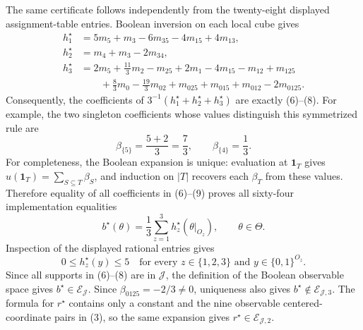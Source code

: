 The same certificate follows independently from the twenty-eight displayed assignment-table entries.  Boolean inversion on each local cube gives
\[
\begin{aligned}
h_1^\star
 &=5m_5+m_3-6m_{35}-4m_{15}+4m_{13},\\
h_2^\star
 &=m_4+m_3-2m_{34},\\
h_3^\star
 &=2m_5+\frac{11}{3}m_2-m_{25}+2m_1-4m_{15}-m_{12}+m_{125}\\
 &\qquad+\frac83m_0-\frac{19}{3}m_{02}+m_{025}+m_{015}+m_{012}-2m_{0125}.
\end{aligned}
\tag{9}
\]
Consequently, the coefficients of \(3^{-1}(h_1^\star+h_2^\star+h_3^\star)\) are exactly (6)--(8).  For example, the two singleton coefficients whose values distinguish this symmetrized rule are
\[
\beta_{\{5\}}=\frac{5+2}{3}=\frac73,
\qquad
\beta_{\{4\}}=\frac{1}{3}.
\tag{10}
\]
For completeness, the Boolean expansion is unique: evaluation at \(\mathbf 1_T\) gives \(u(\mathbf 1_T)=\sum_{S\subseteq T}\beta_S\), and induction on \(|T|\) recovers each \(\beta_T\) from these values.  Therefore equality of all coefficients in (6)--(9) proves all sixty-four implementation equalities
\[
b^\star(\theta)=\frac13\sum_{z=1}^3
h_z^\star(\theta|_{O_z}),
\qquad \theta\in\Theta.
\tag{11}
\]
Inspection of the displayed rational entries gives
\[
0\le h_z^\star(y)\le5
\quad
\text{for every }z\in\{1,2,3\}
\text{ and }y\in\{0,1\}^{O_z}.
\tag{12}
\]
Since all supports in (6)--(8) are in \(\mathcal J\), the definition of the Boolean observable space gives \(b^\star\in\mathcal E_{\mathcal J}\).  Since \(\beta_{0125}=-2/3\ne0\), uniqueness also gives \(b^\star\notin\mathcal E_{\mathcal J,3}\).  The formula for \(r^\star\) contains only a constant and the nine observable centered-coordinate pairs in (3), so the same expansion gives \(r^\star\in\mathcal E_{\mathcal J,2}\).

